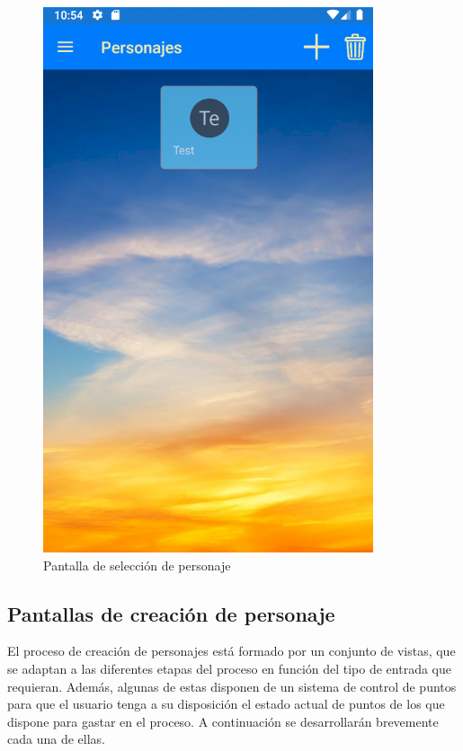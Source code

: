 \begin{figure}[H]
    \centering
    \includegraphics[scale=0.3]{Figures/Capturas/SeleccionPersonajes.png}
    \caption{Pantalla de selección de personaje}
    \label{NombrePersonajeNuevo}    
\end{figure}

\subsection{Pantallas de creación de personaje}
El proceso de creación de personajes está formado por un conjunto de vistas, que se adaptan a las diferentes etapas del 
proceso en función del tipo de entrada que requieran. Además, algunas de estas disponen de un sistema de control de puntos 
para que el usuario tenga a su disposición el estado actual de puntos de los que dispone para gastar en el proceso.
A continuación se desarrollarán brevemente cada una de ellas.


